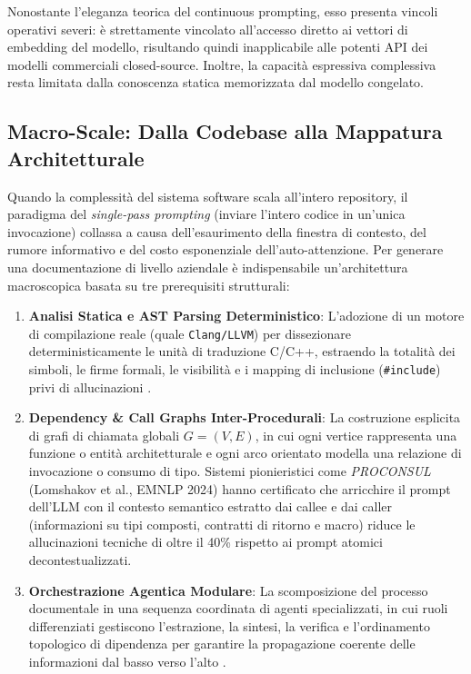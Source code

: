 Nonostante l'eleganza teorica del continuous prompting, esso presenta vincoli operativi severi: è strettamente vincolato all'accesso diretto ai vettori di embedding del modello, risultando quindi inapplicabile alle potenti API dei modelli commerciali closed-source. Inoltre, la capacità espressiva complessiva resta limitata dalla conoscenza statica memorizzata dal modello congelato.

\subsection{Macro-Scale: Dalla Codebase alla Mappatura Architetturale}
\label{subsec:macro_scale}
Quando la complessità del sistema software scala all'intero repository, il paradigma del \emph{single-pass prompting} (inviare l'intero codice in un'unica invocazione) collassa a causa dell'esaurimento della finestra di contesto, del rumore informativo e del costo esponenziale dell'auto-attenzione. Per generare una documentazione di livello aziendale è indispensabile un'architettura macroscopica basata su tre prerequisiti strutturali:
\begin{enumerate}
    \item \textbf{Analisi Statica e AST Parsing Deterministico}: L'adozione di un motore di compilazione reale (quale \texttt{Clang/LLVM}) per dissezionare deterministicamente le unità di traduzione C/C++, estraendo la totalità dei simboli, le firme formali, le visibilità e i mapping di inclusione (\texttt{\#include}) privi di allucinazioni \cite{lomshakov_proconsul_2024}.
    \item \textbf{Dependency \& Call Graphs Inter-Procedurali}: La costruzione esplicita di grafi di chiamata globali $G = (V, E)$, in cui ogni vertice rappresenta una funzione o entità architetturale e ogni arco orientato modella una relazione di invocazione o consumo di tipo. Sistemi pionieristici come \emph{PROCONSUL} (Lomshakov et al., EMNLP 2024) \cite{lomshakov_proconsul_2024} hanno certificato che arricchire il prompt dell'LLM con il contesto semantico estratto dai callee e dai caller (informazioni su tipi composti, contratti di ritorno e macro) riduce le allucinazioni tecniche di oltre il 40\% rispetto ai prompt atomici decontestualizzati.
    \item \textbf{Orchestrazione Agentica Modulare}: La scomposizione del processo documentale in una sequenza coordinata di agenti specializzati, in cui ruoli differenziati gestiscono l'estrazione, la sintesi, la verifica e l'ordinamento topologico di dipendenza per garantire la propagazione coerente delle informazioni dal basso verso l'alto \cite{yang_docagent_2025,hoang_codewiki_2026}.
\end{enumerate}

